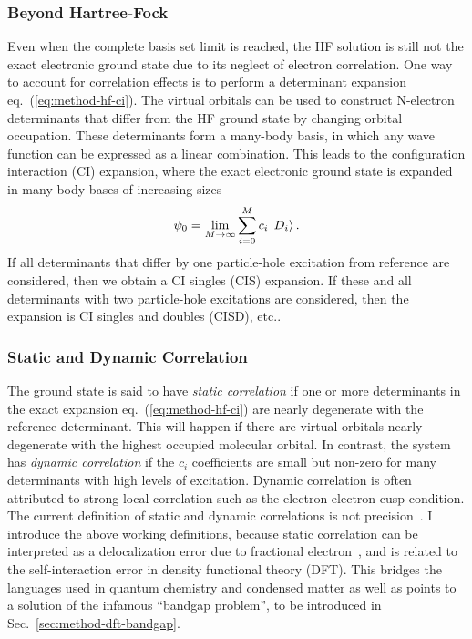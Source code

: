 \subsubsection{Beyond Hartree-Fock}
Even when the complete basis set limit is reached, the HF solution is still not the exact electronic ground state due to its neglect of electron correlation.
One way to account for correlation effects is to perform a determinant expansion eq.~(\ref{eq:method-hf-ci}).
The virtual orbitals can be used to construct N-electron determinants that differ from the HF ground state by changing orbital occupation.
These determinants form a many-body basis, in which any wave function can be expressed as a linear combination.
This leads to the configuration interaction (CI) expansion, where the exact electronic ground state is expanded in many-body bases of increasing sizes
\begin{align} \label{eq:method-hf-ci}
\psi_0 = \lim\limits_{M\rightarrow\infty}\sum\limits_{i=0}^{M} c_i \ket{D_i}.
\end{align}
If all determinants that differ by one particle-hole excitation from reference are considered, then we obtain a CI singles (CIS) expansion. If these and all determinants with two particle-hole excitations are considered, then the expansion is CI singles and doubles (CISD), etc..

\subsubsection{Static and Dynamic Correlation}
The ground state is said to have \textit{static correlation} if one or more determinants in the exact expansion eq.~(\ref{eq:method-hf-ci}) are nearly degenerate with the reference determinant.
This will happen if there are virtual orbitals nearly degenerate with the highest occupied molecular orbital.
In contrast, the system has \textit{dynamic correlation} if the $c_i$ coefficients are small but non-zero for many determinants with high levels of excitation.
Dynamic correlation is often attributed to strong local correlation such as the electron-electron cusp condition.
The current definition of static and dynamic correlations is not precision~\cite{Benavides-Riveros2017}.
I introduce the above working definitions, because static correlation can be interpreted as a delocalization error due to fractional electron~\cite{Cohen2008}, and is related to the self-interaction error in density functional theory (DFT).
This bridges the languages used in quantum chemistry and condensed matter as well as points to a solution of the infamous ``bandgap problem'', to be introduced in  Sec.~\ref{sec:method-dft-bandgap}.

